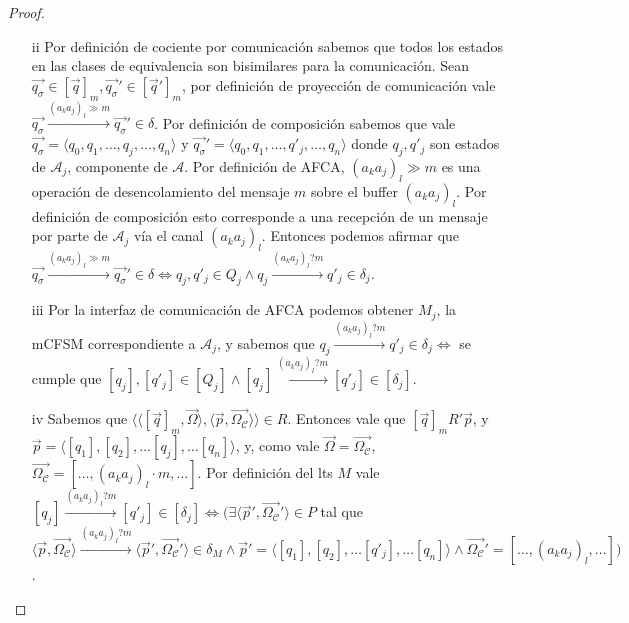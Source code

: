 \begin{proof}
\begin{itemize}
    \item[ii] Por definición de cociente por comunicación sabemos que todos los estados en las clases de equivalencia son bisimilares para la comunicación. Sean $\overrightarrow{q_{\sigma}} \in [\overrightarrow{q}]_m, \overrightarrow{q_{\sigma}}' \in [\overrightarrow{q}']_m$, por definición de proyección de comunicación vale $\overrightarrow{q_{\sigma}} \xrightarrow{(a_ka_j)_l \gg m} \overrightarrow{q_{\sigma}}' \in \delta$. Por definición de composición sabemos que vale $\overrightarrow{q_{\sigma}} =\langle q_0, q_1, \ldots, q_j, \ldots,q_n \rangle$ y $\overrightarrow{q_{\sigma}}' =\langle q_0, q_1, \ldots, q'_j, \ldots,q_n \rangle$ donde $q_j,q'_j$ son estados de $\mathcal{A}_j$, componente de $\mathcal{A}$. Por definición de AFCA, $(a_ka_j)_l \gg m$ es una operación de desencolamiento del mensaje $m$ sobre el buffer $(a_ka_j)_l$. Por definición de composición esto corresponde a una recepción de un mensaje por parte de $\mathcal{A}_j$ vía el canal $(a_ka_j)_l$. Entonces podemos afirmar que $\overrightarrow{q_{\sigma}} \xrightarrow{(a_ka_j)_l \gg m} \overrightarrow{q_{\sigma}}'\in \delta \iff q_j,q'_j \in Q_j \land q_j \xrightarrow{(a_ka_j)_l?m} q'_j \in \delta_j$.
    
    \item[iii] Por la interfaz de comunicación de AFCA podemos obtener $M_j$, la mCFSM correspondiente a $\mathcal{A}_j$, y sabemos que $q_j \xrightarrow{(a_ka_j)_l?m} q'_j \in \delta_j \iff$ se cumple que $[q_j], [q'_j] \in [Q_j] \land [q_j] \xrightarrow{(a_ka_j)_l?m} [q'_j] \in [\delta_j]$.  
    
    \item[iv] Sabemos que $\langle \langle [\overrightarrow{q}]_m, \overrightarrow{\Omega} \rangle, \langle \overrightarrow{p}, \overrightarrow{\Omega_\mathcal{C}} \rangle \rangle \in R$. Entonces vale que $[\overrightarrow{q}]_mR'\overrightarrow{p}$, y $\overrightarrow{p} = \langle [q_1], [q_2], \ldots [q_j], \ldots [q_n] \rangle$, y, como vale $\overrightarrow{\Omega}=\overrightarrow{\Omega_\mathcal{C}}$, $\overrightarrow{\Omega_\mathcal{C}} = [\ldots, (a_ka_j)_l \cdot m, \ldots]$. Por definición del lts $M$ vale $[q_j] \xrightarrow{(a_ka_j)_l?m} [q'_j] \in [\delta_j]  \iff (\exists \langle \overrightarrow{p}', \overrightarrow{\Omega_\mathcal{C}}' \rangle \in P$ tal que $\langle \overrightarrow{p}, \overrightarrow{\Omega_\mathcal{C}} \rangle \xrightarrow{(a_ka_j)_l?m} \langle \overrightarrow{p}', \overrightarrow{\Omega_\mathcal{C}}' \rangle \in \delta_M \land \overrightarrow{p}'= \langle [q_1], [q_2], \ldots [q'_j], \ldots [q_n] \rangle \land \overrightarrow{\Omega_\mathcal{C}}'= [\ldots, (a_ka_j)_l, \ldots])$.
    

\end{itemize}
\end{proof}
